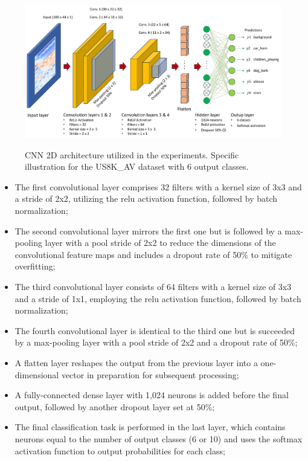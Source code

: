 \begin{figure}[htbp]
    \raggedright
        \caption{CNN 2D architecture utilized in the experiments. Specific illustration for the US8K\_AV dataset with 6 output classes.}
        \includegraphics[width=1\textwidth]{resources/images/050-methods/Methods_training_CNN2D_architecture.jpg}
        \label{fig:methods_training_CNN_2D_architecture}
\end{figure} 

\begin{itemize}
    \item The first convolutional layer comprises 32 filters with a kernel size of 3x3 and a stride of 2x2, utilizing the \gls{relu} activation function, followed by batch normalization;
    \item The second convolutional layer mirrors the first one but is followed by a max-pooling layer with a pool stride of 2x2 to reduce the dimensions of the convolutional feature maps and includes a dropout rate of 50\% to mitigate overfitting;
    \item The third convolutional layer consists of 64 filters with a kernel size of 3x3 and a stride of 1x1, employing the \gls{relu} activation function, followed by batch normalization;
    \item The fourth convolutional layer is identical to the third one but is succeeded by a max-pooling layer with a pool stride of 2x2 and a dropout rate of 50\%;
    \item A flatten layer reshapes the output from the previous layer into a one-dimensional vector in preparation for subsequent processing;
    \item A fully-connected dense layer with 1,024 neurons is added before the final output, followed by another dropout layer set at 50\%;
    \item The final classification task is performed in the last layer, which contains neurons equal to the number of output classes (6 or 10) and uses the softmax activation function to output probabilities for each class;
\end{itemize}

